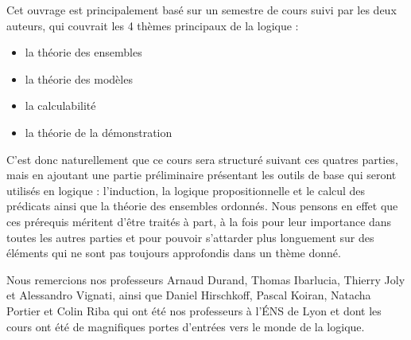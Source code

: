 Cet ouvrage est principalement basé sur un semestre de cours suivi par les deux
auteurs, qui couvrait les 4 thèmes principaux de la logique :
\begin{itemize}
\item la théorie des ensembles
\item la théorie des modèles
\item la calculabilité
\item la théorie de la démonstration
\end{itemize}

C'est donc naturellement que ce cours sera structuré suivant ces quatres
parties, mais en ajoutant une partie préliminaire présentant les outils de base
qui seront utilisés en logique : l'induction, la logique propositionnelle et le
calcul des prédicats ainsi que la théorie des ensembles ordonnés. Nous pensons
en effet que ces prérequis méritent d'être traités à part, à la fois pour leur
importance dans toutes les autres parties et pour pouvoir s'attarder plus
longuement sur des éléments qui ne sont pas toujours approfondis dans un thème
donné.

Nous remercions nos professeurs Arnaud Durand, Thomas Ibarlucia, Thierry Joly et
Alessandro Vignati, ainsi que Daniel Hirschkoff, Pascal Koiran, Natacha Portier
et Colin Riba qui ont été nos professeurs à l'\'ENS de Lyon et dont les cours
ont été de magnifiques portes d'entrées vers le monde de la logique.
